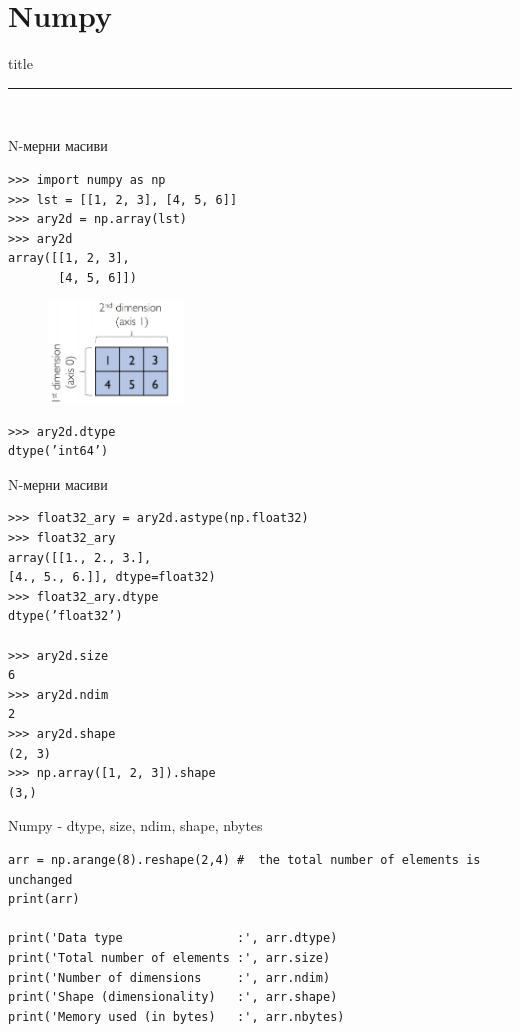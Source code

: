\documentclass{beamer}
\begin{document}

\section{Numpy}

\begin{frame}[plain]
  \vfill
  \centering
  \begin{beamercolorbox}[sep=8pt,center,shadow=true,rounded=true]{title}
    \par%
    \color{oxfordblue}\noindent\rule{10cm}{1pt} \\
  \end{beamercolorbox}
  \vfill
\end{frame}

\begin{frame}[fragile]{N-мерни масиви}
\begin{verbatim}
>>> import numpy as np
>>> lst = [[1, 2, 3], [4, 5, 6]]
>>> ary2d = np.array(lst)
>>> ary2d
array([[1, 2, 3],
       [4, 5, 6]])
\end{verbatim}
\begin{figure}
    \centering
    \includegraphics[width=0.32\textwidth]{np1.png}
\end{figure}
\begin{verbatim}
>>> ary2d.dtype
dtype(’int64’)
\end{verbatim}
\end{frame}

\begin{frame}[fragile]{N-мерни масиви}
\begin{verbatim}
>>> float32_ary = ary2d.astype(np.float32)
>>> float32_ary
array([[1., 2., 3.],
[4., 5., 6.]], dtype=float32)
>>> float32_ary.dtype
dtype(’float32’)

>>> ary2d.size
6
>>> ary2d.ndim
2
>>> ary2d.shape
(2, 3)
>>> np.array([1, 2, 3]).shape
(3,)
\end{verbatim}
\end{frame}

\begin{frame}[fragile]{Numpy - dtype, size, ndim, shape, nbytes}
\begin{lstlisting}
arr = np.arange(8).reshape(2,4) #  the total number of elements is unchanged
print(arr)

print('Data type                :', arr.dtype)
print('Total number of elements :', arr.size)
print('Number of dimensions     :', arr.ndim)
print('Shape (dimensionality)   :', arr.shape)
print('Memory used (in bytes)   :', arr.nbytes)
\end{lstlisting}

\end{frame}
\end{document}
